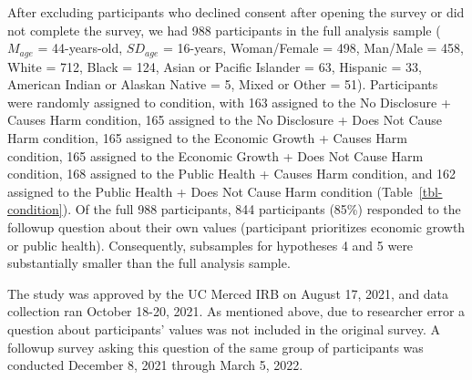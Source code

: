 \documentclass[
  letterpaper,
  DIV=11,
  numbers=noendperiod]{scrartcl}
\begin{document}
After excluding participants who declined consent after opening the
survey or did not complete the survey, we had 988 participants in the
full analysis sample (\(M_{age}\) = 44-years-old, \(SD_{age}\) =
16-years, Woman/Female = 498, Man/Male = 458, White = 712, Black = 124,
Asian or Pacific Islander = 63, Hispanic = 33, American Indian or
Alaskan Native = 5, Mixed or Other = 51). Participants were randomly
assigned to condition, with 163 assigned to the No Disclosure + Causes
Harm condition, 165 assigned to the No Disclosure + Does Not Cause Harm
condition, 165 assigned to the Economic Growth + Causes Harm condition,
165 assigned to the Economic Growth + Does Not Cause Harm condition, 168
assigned to the Public Health + Causes Harm condition, and 162 assigned
to the Public Health + Does Not Cause Harm condition
(Table~\ref{tbl-condition}). Of the full 988 participants, 844
participants (85\%) responded to the followup question about their own
values (participant prioritizes economic growth or public health).
Consequently, subsamples for hypotheses 4 and 5 were substantially
smaller than the full analysis sample.

\hypertarget{tbl-condition}{}
\begin{table}
\caption{\label{tbl-condition}Assignment of participants to conditions }\tabularnewline

\centering
{}
\end{table}

The study was approved by the UC Merced IRB on August 17, 2021, and data
collection ran October 18-20, 2021. As mentioned above, due to
researcher error a question about participants' values was not included
in the original survey. A followup survey asking this question of the
same group of participants was conducted December 8, 2021 through March
5, 2022.
\end{document}
